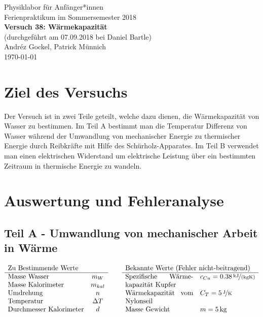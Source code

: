 \documentclass[11pt,a4paper]{article}
\begin{document}
{
\centering 
\large 
Physiklabor für Anf\"anger*innen \\
Ferienpraktikum im Sommersemester 2018 \\[4mm]
\textbf{\LARGE 
Versuch 38: Wärmekapazität
} \\[3mm]
(durchgef\"uhrt am 07.09.2018 bei Daniel Bartle) \\
Andréz Gockel, Patrick M\"unnich\\
\today \\[10mm]
}

\section{Ziel des Versuchs}

Der Versuch ist in zwei Teile geteilt, welche dazu dienen, die Wärmekapazität von Wasser zu bestimmen. Im Teil A bestimmt man die Temperatur Differenz von Wasser während der Umwandlung von mechanischer Energie zu thermischer Energie durch Reibkräfte mit Hilfe des Schürholz-Apparates. Im Teil B verwendet man einen elektrischen Widerstand um elektrische Leistung über ein bestimmten Zeitraum in thermische Energie zu wandeln.

\section{Auswertung und Fehleranalyse}

\subsection{Teil A - Umwandlung von mechanischer Arbeit in Wärme }
$$
\begin{array}{lc}
	\multicolumn{1}{l}{\textrm{Zu Bestimmende Werte}} \\
	\hline
	\textrm{Masse Wasser} & m_W \\
	\textrm{Masse Kalorimeter} & m_{kal} \\
	\textrm{Umdrehung} & n \\
	\textrm{Temperatur} & \Delta T\\
	\textrm{Durchmesser Kalorimeter} & d\\
\end{array}
\qquad
\begin{array}{p{3.5cm}l c}
	\multicolumn{2}{l}{\textrm{Bekannte Werte (Fehler nicht-beitragend)}} \\
	\hline
	\textrm{Spezifische Wärme\-kapazität Kupfer} & c_{Cu} = 0.38\, \nicefrac{\textrm{kJ}}{\textrm{(kgK)}} \\
	\textrm{Wärmekapazität vom Nylonseil} & C_T = 5\, \nicefrac{\textrm{J}}{\textrm{K}} \\
	\textrm{Masse Gewicht} & m = 5\, \textrm{kg} \\
\end{array}
$$
\end{document}
